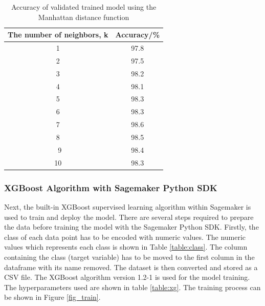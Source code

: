 \begin{table}[ht]
\centering
\begin{center}
\begin{tabular}{ |c|c| } 
  \hline
 The number of neighbors, k  & Accuracy/\%\\ 
  \hline\hline
1 & 97.8\\ 
2 & 97.5\\ 
3 & 98.2\\ 
4 & 98.1\\ 
5 & 98.3\\ 
6 & 98.3\\ 
7 & 98.6\\ 
8 & 98.5\\\ 
9 & 98.4\\ 
10 & 98.3\\ 

 \hline
\end{tabular}
\caption{Accuracy of validated trained model using the Manhattan distance function}
\label{table:manhattan2}
\end{center}
\end{table}

\subsubsection{XGBoost Algorithm with Sagemaker Python SDK}
\label{xgboost-training}
Next, the built-in XGBoost supervised learning algorithm within Sagemaker is used to train and deploy the model. There are several steps required to prepare the data before training the model with the Sagemaker Python SDK. Firstly, the class of each data point has to be encoded with numeric values. The numeric values which represents each class is shown in Table \ref{table:class}. 
The column containing the class (target variable) has to be moved to the first column in the dataframe with its name removed. The dataset is then converted and stored as a CSV file. The XGBoost algorithm version 1.2-1 is used for the model training. The hyperparameters used are shown in table \ref{table:xg}. The training process can be shown in Figure \ref{fig_train}.

